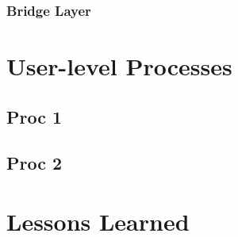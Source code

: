 \documentclass[12pt]{report}
\begin{document}
\section{Bridge Layer}

\part{User-level Processes}

\chapter{Proc 1}

\chapter{Proc 2}

\part{Lessons Learned}
\end{document}
